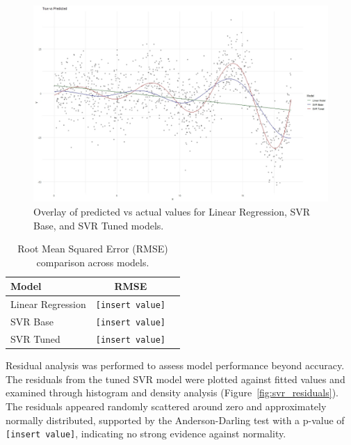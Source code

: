 \documentclass[8pt,twocolumn]{article}
\begin{document}
\begin{figure}[htbp]
    \centering
    \includegraphics[width=0.8\columnwidth]{plot_pred_vs_true_svm_p5.jpg}
    \caption{Overlay of predicted vs actual values for Linear Regression, SVR Base, and SVR Tuned models.}
    \label{fig:svr_overlay}
    \vspace{-10pt}
\end{figure}

\begin{table}[htbp]
    \centering
    \begin{tabular}{lcc}
    \hline
    \textbf{Model} & \textbf{RMSE} \\
    \hline
    Linear Regression & \texttt{[insert value]} \\
    SVR Base          & \texttt{[insert value]} \\
    SVR Tuned         & \texttt{[insert value]} \\
    \hline
    \end{tabular}
    \caption{Root Mean Squared Error (RMSE) comparison across models.}
    \label{tab:svr_rmse}
\end{table}

Residual analysis was performed to assess model performance beyond accuracy. The residuals from the tuned SVR model were plotted against fitted values and examined through histogram and density analysis (Figure~\ref{fig:svr_residuals}). The residuals appeared randomly scattered around zero and approximately normally distributed, supported by the Anderson-Darling test with a p-value of \texttt{[insert value]}, indicating no strong evidence against normality.
\end{document}
